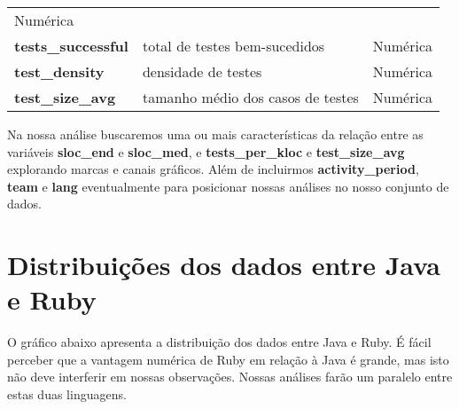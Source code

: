 \documentclass[]{article}
\begin{document}
\begin{longtable}[]{@{}lll@{}}
\begin{minipage}[t]{0.10\columnwidth}
Numérica\strut
\end{minipage}\tabularnewline
\begin{minipage}[t]{0.21\columnwidth}\raggedright\strut
\textbf{tests\_successful}\strut
\end{minipage} & \begin{minipage}[t]{0.61\columnwidth}\raggedright\strut
total de testes bem-sucedidos\strut
\end{minipage} & \begin{minipage}[t]{0.10\columnwidth}\raggedright\strut
Numérica\strut
\end{minipage}\tabularnewline
\begin{minipage}[t]{0.21\columnwidth}\raggedright\strut
\textbf{test\_density}\strut
\end{minipage} & \begin{minipage}[t]{0.61\columnwidth}\raggedright\strut
densidade de testes\strut
\end{minipage} & \begin{minipage}[t]{0.10\columnwidth}\raggedright\strut
Numérica\strut
\end{minipage}\tabularnewline
\begin{minipage}[t]{0.21\columnwidth}\raggedright\strut
\textbf{test\_size\_avg}\strut
\end{minipage} & \begin{minipage}[t]{0.61\columnwidth}\raggedright\strut
tamanho médio dos casos de testes\strut
\end{minipage} & \begin{minipage}[t]{0.10\columnwidth}\raggedright\strut
Numérica\strut
\end{minipage}\tabularnewline
\bottomrule
\end{longtable}

Na nossa análise buscaremos uma ou mais características da relação entre
as variáveis \textbf{sloc\_end} e \textbf{sloc\_med}, e
\textbf{tests\_per\_kloc} e \textbf{test\_size\_avg} explorando marcas e
canais gráficos. Além de incluirmos \textbf{activity\_period},
\textbf{team} e \textbf{lang} eventualmente para posicionar nossas
análises no nosso conjunto de dados.

\section{Distribuições dos dados entre Java e
Ruby}\label{distribuicoes-dos-dados-entre-java-e-ruby}

O gráfico abaixo apresenta a distribuição dos dados entre Java e Ruby. É
fácil perceber que a vantagem numérica de Ruby em relação à Java é
grande, mas isto não deve interferir em nossas observações. Nossas
análises farão um paralelo entre estas duas linguagens.
\end{document}
